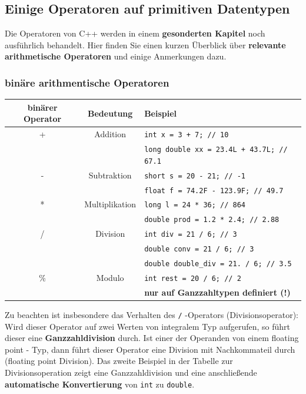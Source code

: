 \documentclass[a4paper]{report}
\begin{document}
%	



\subsection{Einige Operatoren auf primitiven Datentypen}
Die Operatoren von C++ werden in einem \textbf{gesonderten Kapitel} noch ausführlich behandelt. Hier finden Sie einen kurzen Überblick über \textbf{relevante arithmetische Operatoren} und einige Anmerkungen dazu.
\subsubsection{binäre arithmentische Operatoren}
\begin{center}
\begin{tabular}{|c|c|p{8cm}|} \hline
	\textbf{binärer Operator} & \textbf{Bedeutung} & \textbf{Beispiel} \\ \hline
	+ & Addition & \texttt{int x = 3 + 7; // 10} \\
	&& \texttt{long double xx = 23.4L + 43.7L; // 67.1} \\ \hline
	- & Subtraktion & \texttt{short s = 20 - 21; // -1}\\
	&& \texttt{float f = 74.2F - 123.9F; // 49.7} \\ \hline
	* & Multiplikation & \texttt{long l = 24 * 36; // 864}\\
	&& \texttt{double prod = 1.2 * 2.4; // 2.88} \\ \hline
	/ & Division & \texttt{int div = 21 / 6; // 3}\\ 
	&& \texttt{double conv = 21 / 6; // 3} \\
	&& \texttt{double double\_div = 21. / 6; // 3.5} \\ \hline 
	\% & Modulo & \texttt{int rest = 20 / 6; // 2}\\ 
	&& \textbf{nur auf Ganzzahltypen definiert (!)} \\ \hline
\end{tabular}
\end{center}
Zu beachten ist insbesondere das Verhalten des \texttt{/} -Operators (Divisionsoperator): Wird dieser Operator auf zwei Werten von integralem Typ aufgerufen, so führt dieser eine \textbf{Ganzzahldivision} durch. Ist einer der Operanden von einem floating point - Typ, dann führt dieser Operator eine Division mit Nachkommateil durch (floating point Division). Das zweite Beispiel in der Tabelle zur Divisionsoperation zeigt eine Ganzzahldivision und eine anschließende \textbf{automatische Konvertierung} von \texttt{int} zu \texttt{double}.
\end{document}
